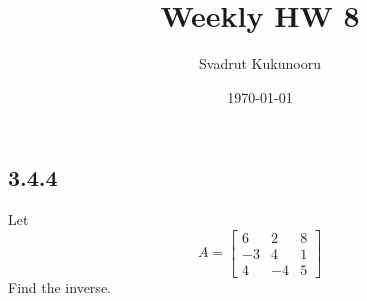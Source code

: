 \documentclass[letterpaper]{report}
\title{Weekly HW 8}
\author{Svadrut Kukunooru}
\date{\today}
\begin{document}
\begin{titlepage}
    \maketitle
\end{titlepage}
    \subsection{3.4.4}%
    Let 
    \[
    A = 
    \begin{bmatrix} 
        6 & 2 & 8 \\
        -3 & 4 & 1 \\
        4 & -4 & 5 
    \end{bmatrix}
    \] 
    Find the inverse. 
    
\end{document}
